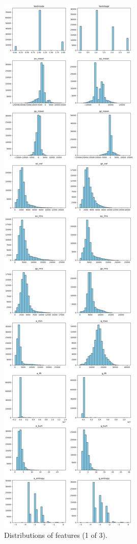 \documentclass[10pt,twocolumn]{article}
\begin{document}
\begin{figure}[H]
    \centering
    \includegraphics[width=0.85\linewidth, height=0.9\textheight]{images/distribution_1.png}
    \caption{Distributions of features (1 of 3).}
    \label{fig:distribution-1}
\end{figure}
\end{document}
